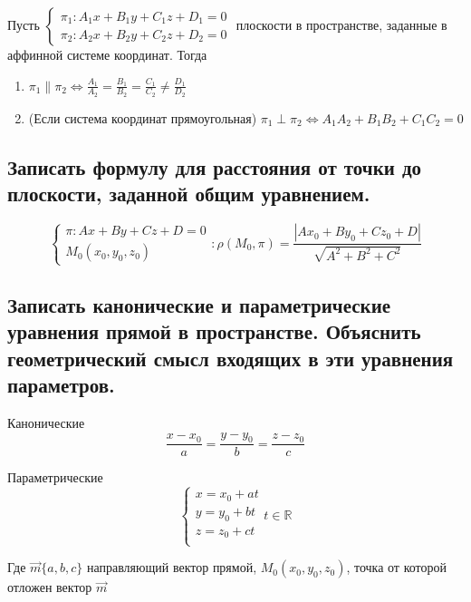 \documentclass[a4paper, 10pt]{article}
\begin{document}
Пусть $\begin{cases}\pi_1: A_1x+B_1y+C_1z+D_1 = 0\\\pi_2: A_2x+B_2y+C_2z+D_2 = 0\end{cases}$
плоскости в пространстве, заданные в аффинной системе координат. Тогда 
\begin{enumerate}
    \item $\pi_1 \parallel \pi_2 \iff \frac{A_1}{A_2} = \frac{B_1}{B_2} = \frac{C_1}{C_2} \ne \frac{D_1}{D_2}$
    \item (Если система координат прямоугольная) $\pi_1 \perp \pi_2 \iff A_1A_2 + B_1B_2 + C_1C_2 = 0$
\end{enumerate} 


\subsection{Записать формулу для расстояния от точки до плоскости, заданной общим уравнением. }

$$\begin{cases}\pi: Ax+By+Cz+D = 0\\M_0(x_0,y_0,z_0)\end{cases}: \rho(M_0,\pi) = 
\frac{ |Ax_0+By_0+Cz_0+D| }{\sqrt{A^2+B^2+C^2}}$$

\subsection{Записать канонические и параметрические уравнения прямой в пространстве. 
Объяснить геометрический смысл входящих в эти уравнения параметров.}

Канонические 
$$ \frac{x-x_0}{a} = \frac{y-y_0}{b} = \frac{z-z_0}{c}$$

Параметрические
$$\begin{cases}x = x_0 + at\\y = y_0 + bt\\z = z_0 + ct\\\end{cases} t \in \mathbb{R}$$

Где $\vec{m}\{a,b,c\}$ направляющий вектор прямой, $M_0(x_0,y_0,z_0)$, точка
от которой отложен вектор $\vec{m}$
\end{document}
